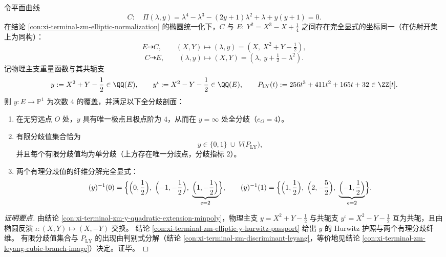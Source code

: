 \begin{conclusion}[谱四次的显式椭圆化与共轭重量覆盖的分歧剖面]\label{con:xi-terminal-zm-elliptic-normalization-y-iota-ramification-portrait}
令平面曲线
\[
C:\quad \Pi(\lambda,y)=\lambda^{4}-\lambda^{3}-(2y+1)\lambda^{2}+\lambda+y(y+1)=0.
\]
在结论 \ref{con:xi-terminal-zm-elliptic-normalization} 的椭圆统一化下，\(C\) 与
\(
E:\ Y^{2}=X^{3}-X+\tfrac14
\)
之间存在完全显式的坐标同一（在仿射开集上为同构）：
\[
E\dashrightarrow C,\qquad (X,Y)\longmapsto (\lambda,y)=(X,\ X^{2}+Y-\tfrac12),
\]
\[
C\dashrightarrow E,\qquad (\lambda,y)\longmapsto (X,Y)=(\lambda,\ y+\tfrac12-\lambda^{2}).
\]
记物理主支重量函数与其共轭支
\[
y:=X^{2}+Y-\frac12\in\QQ(E),
\qquad
y^{\iota}:=X^{2}-Y-\frac12\in\QQ(E),
\qquad
P_{\mathrm{LY}}(t):=256t^{3}+411t^{2}+165t+32\in\ZZ[t].
\]
则 \(y:E\to\mathbb P^{1}\) 为次数 \(4\) 的覆盖，并满足以下全分歧剖面：
\begin{enumerate}
  \item 在无穷远点 \(O\) 处，\(y\) 具有唯一极点且极点阶为 \(4\)，从而在 \(y=\infty\) 处全分歧（\(e_{O}=4\)）。
  \item 有限分歧值集合恰为
  \[
  y\in\{0,1\}\ \cup\ V\!\bigl(P_{\mathrm{LY}}\bigr),
  \]
  并且每个有限分歧值均为单分歧（上方存在唯一分歧点，分歧指标 \(2\)）。
  \item 两个有理分歧值的纤维分解完全显式：
  \[
  (y)^{-1}(0)=\Bigl\{\Bigl(0,\frac12\Bigr),\ \Bigl(-1,-\frac12\Bigr),\ \underbrace{\Bigl(1,-\frac12\Bigr)}_{e=2}\Bigr\},
  \qquad
  (y)^{-1}(1)=\Bigl\{\Bigl(1,\frac12\Bigr),\ \Bigl(2,-\frac52\Bigr),\ \underbrace{\Bigl(-1,\frac12\Bigr)}_{e=2}\Bigr\}.
  \]
\end{enumerate}
\end{conclusion}
\begin{proof}[证明要点]
由结论 \ref{con:xi-terminal-zm-y-quadratic-extension-minpoly}，物理主支 \(y=X^{2}+Y-\tfrac12\) 与共轭支 \(y^{\iota}=X^{2}-Y-\tfrac12\) 互为共轭，且由椭圆反演 \(\iota:(X,Y)\mapsto(X,-Y)\) 交换。
结论 \ref{con:xi-terminal-zm-elliptic-y-hurwitz-passport} 给出 \(y\) 的 Hurwitz 护照与两个有理分歧纤维。
有限分歧值集合与 \(P_{\mathrm{LY}}\) 的出现由判别式分解（结论 \ref{con:xi-terminal-zm-discriminant-leyang}，等价地见结论 \ref{con:xi-terminal-zm-leyang-cubic-branch-image}）决定。证毕。
\end{proof}

